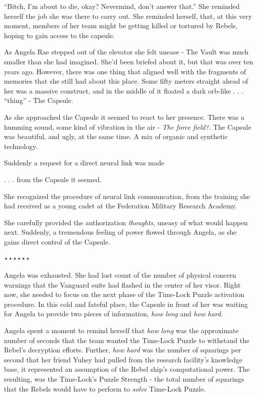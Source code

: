 \documentclass[smalldemyvopaper,11pt,twoside,onecolumn,openright,extrafontsizes]{memoir}
\begin{document}
 
  “Bitch, I’m about to die, okay? Nevermind, don’t answer that.” She reminded herself the job she was there to carry out. She reminded herself, that, at this very moment, members of her team might be getting killed or tortured by Rebels, hoping to gain access to the capsule.

 
  As Angela Rae stepped out of the elevator she felt unease - The Vault was much smaller than she had imagined. She’d been briefed about it, but that was over ten years ago. However, there was one thing that aligned well with the fragments of memories that she still had about this place. Some fifty meters straight ahead of her was a massive construct, and in the middle of it floated a dark orb-like . . . “thing” - The Capsule.

 
  As she approached the Capsule it seemed to react to her presence. There was a humming sound, some kind of vibration in the air - \textit{The force field?}. The Capsule was beautiful, and ugly, at the same time. A mix of organic and synthetic technology.

 
  Suddenly a request for a direct neural link was made

 
  . . . from the Capsule it seemed.

 She recognized the procedure of neural link communcation, from the training she had received as a young cadet at the Federation Military Research Academy.

 
 She carefully provided the authorization \textit{thoughts}, uneasy of what would happen next. Suddenly, a tremendous feeling of power flowed through Angela, as she gains direct control of the Capsule.

⋆⋆⋆⋆⋆⋆

Angela was exhausted. She had lost count of the number of physical concern warnings that the Vanguard suite had flashed in the center of her visor. Right now, she needed to focus on the next phase of the Time-Lock Puzzle activation procedure. In this cold and fateful place, the Capsule in front of her was waiting for Angela to provide two pieces of information, \textit{how long} and \textit{how hard}.

 
Angela spent a moment to remind herself that \textit{how long} was the approximate number of seconds that the team wanted the Time-Lock Puzzle to withstand the Rebel’s decryption efforts. Further, \textit{how hard} was the number of squarings per second that her friend Yuhey had pulled from the research facility’s knowledge base, it represented an assumption of the Rebel ship’s computational power. The resulting, was the Time-Lock’s Puzzle Strength - the total number of squarings that the Rebels would have to perform to \textit{solve} Time-Lock Puzzle.
\end{document}

